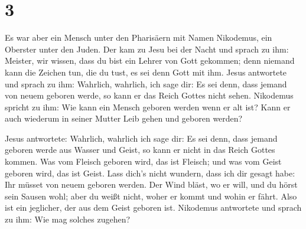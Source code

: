 \hypertarget{section-2}{%
\section{3}\label{section-2}}

 Es war aber ein Mensch unter den Pharisäern mit Namen
Nikodemus, ein Oberster unter den Juden.  Der kam zu Jesu
bei der Nacht und sprach zu ihm: Meister, wir wissen, dass du bist ein
Lehrer von Gott gekommen; denn niemand kann die Zeichen tun, die du
tust, es sei denn Gott mit ihm.  Jesus antwortete und
sprach zu ihm: Wahrlich, wahrlich, ich sage dir: Es sei denn, dass
jemand von neuem geboren werde, so kann er das Reich Gottes nicht sehen.
 Nikodemus spricht zu ihm: Wie kann ein Mensch geboren
werden wenn er alt ist? Kann er auch wiederum in seiner Mutter Leib
gehen und geboren werden?

 Jesus antwortete: Wahrlich, wahrlich ich sage dir: Es sei
denn, dass jemand geboren werde aus Wasser und Geist, so kann er nicht
in das Reich Gottes kommen.  Was vom Fleisch geboren wird,
das ist Fleisch; und was vom Geist geboren wird, das ist Geist.
 Lass dich's nicht wundern, dass ich dir gesagt habe: Ihr
müsset von neuem geboren werden.  Der Wind bläst, wo er
will, und du hörst sein Sausen wohl; aber du weißt nicht, woher er kommt
und wohin er fährt. Also ist ein jeglicher, der aus dem Geist geboren
ist.  Nikodemus antwortete und sprach zu ihm: Wie mag
solches zugehen?

